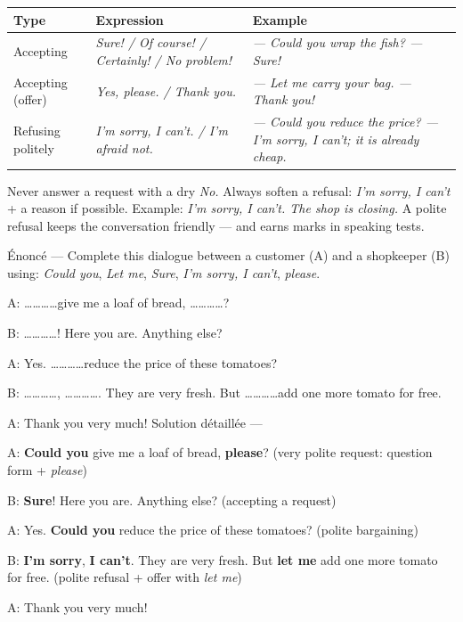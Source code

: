 \documentclass[11pt]{article}
\begin{document}
\begin{center}
\begin{tabularx}{\linewidth}{|l|X|X|}
\hline
\rowcolor{popblueL}
\textbf{Type} & \textbf{Expression} & \textbf{Example} \\
\hline
Accepting & \emph{Sure! / Of course! / Certainly! / No problem!} & \emph{— Could you wrap the fish? — Sure!} \\
\hline
Accepting (offer) & \emph{Yes, please. / Thank you.} & \emph{— Let me carry your bag. — Thank you!} \\
\hline
Refusing politely & \emph{I'm sorry, I can't. / I'm afraid not.} & \emph{— Could you reduce the price? — I'm sorry, I can't; it is already cheap.} \\
\hline
\end{tabularx}
\end{center}

\begin{attention}
Never answer a request with a dry \emph{No.} Always soften a refusal: \emph{I'm sorry, I can't} + a reason if possible. Example: \emph{I'm sorry, I can't. The shop is closing.} A polite refusal keeps the conversation friendly — and earns marks in speaking tests.
\end{attention}

\begin{exoresolu}
Énoncé — Complete this dialogue between a customer (A) and a shopkeeper (B) using: \emph{Could you}, \emph{Let me}, \emph{Sure}, \emph{I'm sorry, I can't}, \emph{please}.

A: \ldots\ldots\ldots\ldots give me a loaf of bread, \ldots\ldots\ldots\ldots?

B: \ldots\ldots\ldots\ldots! Here you are. Anything else?

A: Yes. \ldots\ldots\ldots\ldots reduce the price of these tomatoes?

B: \ldots\ldots\ldots\ldots, \ldots\ldots\ldots\ldots. They are very fresh. But \ldots\ldots\ldots\ldots add one more tomato for free.

A: Thank you very much!
\tcblower
Solution détaillée —

A: \textbf{Could you} give me a loaf of bread, \textbf{please}? (very polite request: question form + \emph{please})

B: \textbf{Sure}! Here you are. Anything else? (accepting a request)

A: Yes. \textbf{Could you} reduce the price of these tomatoes? (polite bargaining)

B: \textbf{I'm sorry}, \textbf{I can't}. They are very fresh. But \textbf{let me} add one more tomato for free. (polite refusal + offer with \emph{let me})

A: Thank you very much!
\end{exoresolu}
\end{document}
